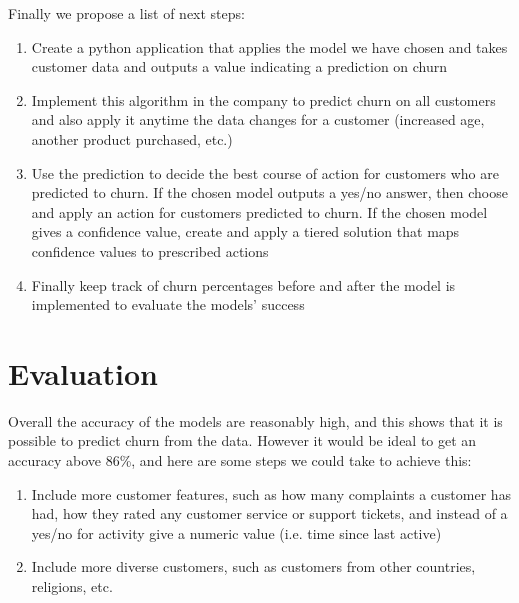 \documentclass[]{article}
\newcommand{\winningaccuracy}{86\%\xspace}
\begin{document}
Finally we propose a list of next steps:

\begin{enumerate}
	\item Create a python application that applies the model we have chosen and takes customer data and outputs a value indicating a prediction on churn
	\item Implement this algorithm in the company to predict churn on all customers and also apply it anytime the data changes for a customer (increased age, another product purchased, etc.)
	\item Use the prediction to decide the best course of action for customers who are predicted to churn. If the chosen model outputs a yes/no answer, then choose and apply an action for customers predicted to churn. If the chosen model gives a confidence value, create and apply a tiered solution that maps confidence values to prescribed actions
	\item Finally keep track of churn percentages before and after the model is implemented to evaluate the models’ success
\end{enumerate}

\section{Evaluation}

Overall the accuracy of the models are reasonably high, and this shows that it is possible to predict churn from the data. However it would be ideal to get an accuracy above \winningaccuracy, and here are some steps we could take to achieve this:

\begin{enumerate}
	\item Include more customer features, such as how many complaints a customer has had, how they rated any customer service or support tickets, and instead of a yes/no for activity give a numeric value (i.e. time since last active)
	\item Include more diverse customers, such as customers from other countries, religions, etc.
\end{enumerate}
\end{document}
